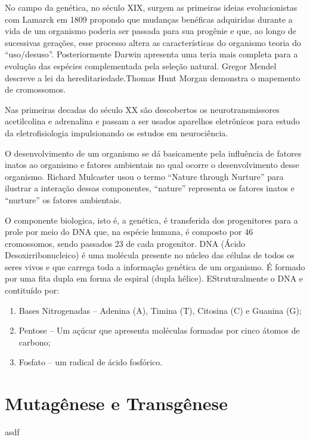 \documentclass[
	article,			%
	12pt,				%
	oneside,			%
	a4paper,			%
	english,			%
	brazil,				%
	sumario=tradicional
	]{abntex2}
\begin{document}
No campo da genética, no século XIX, surgem as primeiras ideias evolucionistas com Lamarck em 1809 propondo que mudanças benéficas adquiridas durante a vida de um organismo poderia ser passada para sua progênie e que, ao longo de sucessivas gerações, esse processo altera as características do organismo teoria do ``uso/desuso''. Posteriormente Darwin apresenta uma teria mais completa para a evolução das espécies complementada pela seleção natural.
Gregor	Mendel descreve a lei da hereditariedade.Thomas Hunt Morgan demonstra o mapemento de cromossomos.

Nas primeiras decadas do século XX são descobertos os neurotransmissores acetilcolina e adrenalina e passam a ser usados aparelhos eletrônicos para estudo da eletrofisiologia impulsionando os estudos em neurociência.

O desenvolvimento de um organismo se dá basicamente pela influência de fatores inatos ao organismo e fatores ambientais no qual ocorre o desenvolvimento desse organismo. Richard Mulcaster usou o termo ``Nature through Nurture'' para ilustrar a interação dessas componentes, ``nature'' representa os fatores inatos e ``nurture'' os fatores ambientais.

O componente biologica, isto é, a genética, é transferida dos progenitores para a prole por meio do DNA que, na espécie humana, é composto por 46 cromossomos, sendo passados 23 de cada progenitor.
DNA  (Ácido Desoxirribonucleico) é uma molécula presente no núcleo das células de todos os seres vivos e que carrega toda a informação genética de um organismo. É formado por uma fita dupla em forma de espiral (dupla hélice).
EStruturalmente o DNA e contituído por:
\begin{enumerate}
    
    \item Bases Nitrogenadas – Adenina (A), Timina (T), Citosina (C) e Guanina (G);
    \item Pentose – Um açúcar que apresenta moléculas formadas por cinco átomos de carbono;
    \item Fosfato – um radical de ácido fosfórico.

\end{enumerate}







\section{Mutagênese e Transgênese}
\label{mutagenesetransgenese}
asdf
\end{document}
